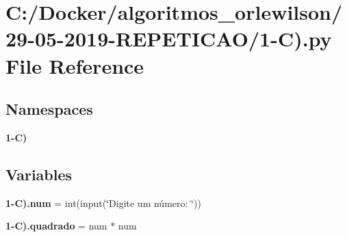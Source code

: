 \section{C\+:/\+Docker/algoritmos\+\_\+orlewilson/29-\/05-\/2019-\/\+R\+E\+P\+E\+T\+I\+C\+A\+O/1-\/C).py File Reference}
\label{1-_c_08_8py}
\subsection*{Namespaces}
\begin{DoxyCompactItemize}
\item 
 \textbf{ 1-\/\+C)}
\end{DoxyCompactItemize}
\subsection*{Variables}
\begin{DoxyCompactItemize}
\item 
\textbf{ 1-\/\+C).\+num} = int(input(\char`\"{}Digite um número\+: \char`\"{}))
\item 
\textbf{ 1-\/\+C).\+quadrado} = num $\ast$ num
\end{DoxyCompactItemize}

